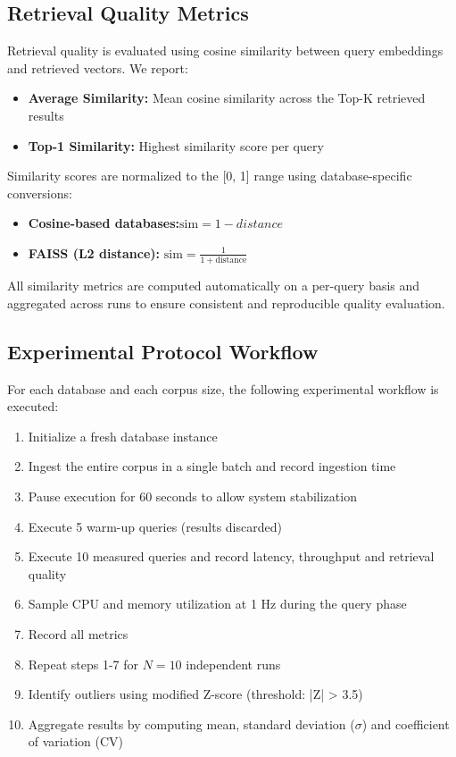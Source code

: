 \documentclass{article}
\begin{document}
\subsection{Retrieval Quality Metrics}
Retrieval quality is evaluated using cosine similarity between query embeddings and retrieved vectors. We report:
\begin{itemize}
    \item \textbf{Average Similarity:} Mean cosine similarity across the Top-K retrieved results
    \item \textbf{Top-1 Similarity:} Highest similarity score per query
\end{itemize}
Similarity scores are normalized to the [0, 1] range using database-specific conversions:
\begin{itemize}
     \item \textbf{Cosine-based databases:}$\text{sim} = 1 - distance$
    \item \textbf{FAISS (L2 distance):} $\text{sim} = \frac{1}{1 + \text{distance}}$
\end{itemize}

All similarity metrics are computed automatically on a per-query basis and aggregated across runs to ensure consistent and reproducible quality evaluation.

\subsection{Experimental Protocol Workflow}
For each database and each corpus size, the following experimental workflow is executed:
\begin{enumerate}
    \item Initialize a fresh database instance
    \item Ingest the entire corpus in a single batch and record ingestion time
    \item Pause execution for 60 seconds to allow system stabilization
    \item Execute 5 warm-up queries (results discarded)
    \item Execute 10 measured queries and record latency, throughput and retrieval quality
    \item Sample CPU and memory utilization at 1 Hz during the query phase
    \item Record all metrics
    \item Repeat steps 1-7 for $N = 10$ independent runs
    \item Identify outliers using modified Z-score (threshold: |Z| > 3.5)
    \item Aggregate results by computing mean, standard deviation ($\sigma$) and coefficient of variation (CV)
\end{enumerate}
\end{document}

